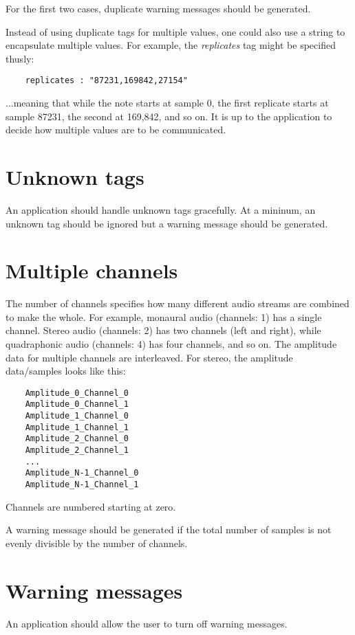 \documentclass{article}
\begin{document}
For the first two cases, duplicate warning messages should be
generated.

Instead of using duplicate tags for multiple values, one
could also use a string to encapsulate multiple values.
For example, the {\it replicates} tag might be specified
thusly:

\begin{verbatim}
    replicates : "87231,169842,27154"
\end{verbatim}

...meaning that while the note starts at sample 0, the first replicate
starts at sample 87231, the second at 169,842, and so on.
It is up to the application to decide how multiple values are
to be communicated.

\section{Unknown tags}

An application should handle unknown tags gracefully. At a mininum,
an unknown tag should be ignored but a warning message should
be generated.

\section{Multiple channels}

The number of channels specifies how many different audio streams are
combined to make the whole. For example, monaural audio (channels: 1)
has a single channel.  Stereo audio (channels: 2) has two channels
(left and right), while quadraphonic audio (channels: 4) has four
channels, and so on. The amplitude data for multiple channels
are interleaved. For stereo, the amplitude data/samples looks like this:

\begin{verbatim}
    Amplitude_0_Channel_0
    Amplitude_0_Channel_1
    Amplitude_1_Channel_0
    Amplitude_1_Channel_1
    Amplitude_2_Channel_0
    Amplitude_2_Channel_1
    ...
    Amplitude_N-1_Channel_0
    Amplitude_N-1_Channel_1
\end{verbatim}

Channels are numbered starting at zero.

A warning message should be generated if the total number of
samples is not evenly divisible by the number of channels.

\section{Warning messages}

An application should allow the user to turn off warning messages.
\end{document}
